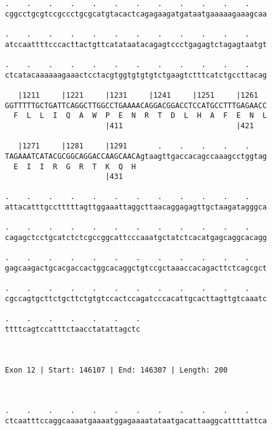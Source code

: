 \documentclass{article}
\begin{document}
\begin{Verbatim}
.    .    .    .    .    .    .    .    .    .    .    .    
cggcctgcgtccgccctgcgcatgtacactcagagaagatgataatgaaaaagaaagcaa
                                                            
.    .    .    .    .    .    .    .    .    .    .    .    
atccaattttcccacttactgttcatataatacagagtccctgagagtctagagtaatgt
                                                            
.    .    .    .    .    .    .    .    .    .    .    .    
ctcatacaaaaaagaaactcctacgtggtgtgtgtctgaagtctttcatctgccttacag
                                                            
   |1211     |1221     |1231     |1241     |1251     |1261  
GGTTTTTGCTGATTCAGGCTTGGCCTGAAAACAGGACGGACCTCCATGCCTTTGAGAACC
  F  L  L  I  Q  A  W  P  E  N  R  T  D  L  H  A  F  E  N  L
                       |411                          |421   
  
   |1271     |1281     |1291       .    .    .    .    .    
TAGAAATCATACGCGGCAGGACCAAGCAACAgtaagttgaccacagccaaagcctggtag
  E  I  I  R  G  R  T  K  Q  H                              
                       |431                                 
  
.    .    .    .    .    .    .    .    .    .    .    .    
attacatttgcctttttagttggaaattaggcttaacaggagagttgctaagatagggca
                                                            
.    .    .    .    .    .    .    .    .    .    .    .    
cagagctcctgcatctctcgccggcattcccaaatgctatctcacatgagcaggcacagg
                                                            
.    .    .    .    .    .    .    .    .    .    .    .    
gagcaagactgcacgaccactggcacaggctgtccgctaaaccacagacttctcagcgct
                                                            
.    .    .    .    .    .    .    .    .    .    .    .    
cgccagtgcttctgcttctgtgtccactccagatcccacattgcacttagttgtcaaatc
                                                            
.    .    .    .    .    .    .
ttttcagtccatttctaacctatattagctc
                               
                               
 
Exon 12 | Start: 146107 | End: 146307 | Length: 200



.    .    .    .    .    .    .    .    .    .    .    .    
ctcaatttccaggcaaaatgaaaatggagaaaatataatgacattaaggcattttattca
                                                            

\end{Verbatim}
\end{document}
